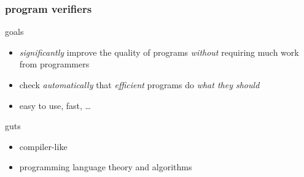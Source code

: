 \documentclass{beamer}
\title{\titletext}
\author{Radu Grigore}
\subtitle{\url{http://code.google.com/p/freeboogie}}
\date{23 August 2010}
\begin{document}
\maketitle
\begin{frame}
  \frametitle{program verifiers}
  \begin{block}{goals}
  \begin{itemize}
  \item
    \emph{significantly} improve the quality of programs 
    \emph{without} requiring much work from programmers
  \item 
    check \emph{automatically} that \emph{efficient} programs do
    \emph{what they should}
  \item
    easy to use, fast, \dots
  \end{itemize}
  \end{block}

  \begin{block}{guts}
  \begin{itemize}
  \item compiler-like
  \item programming language theory and algorithms
  \end{itemize}
  \end{block}
\end{frame}
\end{document}
